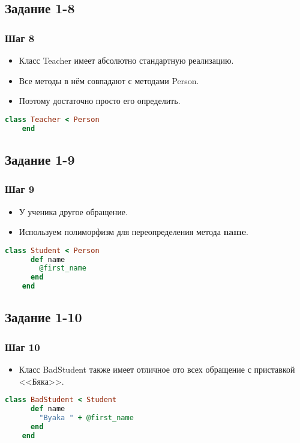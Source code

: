\documentclass[compress,red]{beamer}
\begin{document}
\subsection{Задание 1-8}
\begin{frame}[fragile]
  \frametitle{Шаг 8}
  \begin{itemize}
    \item Класс Teacher имеет абсолютно стандартную реализацию.
    \item Все методы в нём совпадают с методами Person.
    \item Поэтому достаточно просто его определить.
  \end{itemize}
  
  \scriptsize{
  \begin{lstlisting}[language=ruby,basicstyle=\footnotesize,label=ruby8,caption=Teacher]
    class Teacher < Person
    end
  \end{lstlisting}
  }
  
\end{frame}

\subsection{Задание 1-9}
\begin{frame}[fragile]
  \frametitle{Шаг 9}
  \begin{itemize}
    \item У ученика другое обращение.
    \item Используем полиморфизм для переопределения метода \textbf{name}.
  \end{itemize}
  \scriptsize{
  \begin{lstlisting}[language=ruby,basicstyle=\footnotesize,label=ruby9,caption=Student]
    class Student < Person
      def name
        @first_name
      end
    end
  \end{lstlisting}
  }
\end{frame}

\subsection{Задание 1-10}
\begin{frame}[fragile]
  \frametitle{Шаг 10}
  \begin{itemize}
    \item Класс BadStudent также имеет отличное ото всех обращение с приставкой <<Бяка>>.
  \end{itemize}
  \scriptsize{
  \begin{lstlisting}[language=ruby,basicstyle=\footnotesize,label=ruby10,caption=BadStudent]
    class BadStudent < Student
      def name
        "Byaka " + @first_name
      end
    end
  \end{lstlisting}
  }
\end{frame}
\end{document}
